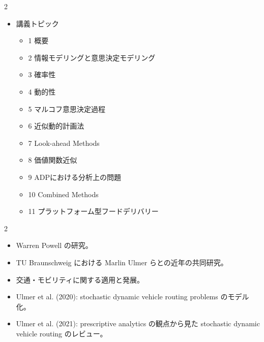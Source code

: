 \clearpage



\vspace{1.5mm}

\begin{multicols}{2}

\footnotesize

\raggedcolumns


\begin{itemize}
\item 講義トピック
\begin{itemize}
\item 1 概要
\item 2 情報モデリングと意思決定モデリング
\item 3 確率性
\item 4 動的性
\item 5 マルコフ意思決定過程
\item 6 近似動的計画法
\item 7 Look-ahead Methods
\item 8 価値関数近似
\item 9 ADPにおける分析上の問題
\item 10 Combined Methods
\item 11 プラットフォーム型フードデリバリー
\end{itemize}
\end{itemize}

\end{multicols}

\clearpage



\vspace{1.5mm}

\begin{multicols}{2}

\footnotesize

\raggedcolumns


\begin{itemize}
\item Warren Powell の研究。
\item TU Braunschweig における Marlin Ulmer らとの近年の共同研究。
\item 交通・モビリティに関する適用と発展。
\item Ulmer et al. (2020): stochastic dynamic vehicle routing problems のモデル化。
\item Ulmer et al. (2021): prescriptive analytics の観点から見た stochastic dynamic vehicle routing のレビュー。
\end{itemize}

\end{multicols}

